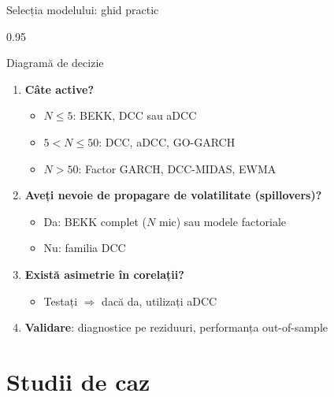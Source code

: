 \documentclass[9pt, aspectratio=169, t]{beamer}
\begin{document}
\begin{frame}{Selecția modelului: ghid practic}
    \begin{cminipage}{0.95\textwidth}
    {\footnotesize
    \begin{block}{Diagramă de decizie}
        \begin{enumerate}\setlength{\itemsep}{2pt}
            \item \textbf{Câte active?}
                \begin{itemize}\setlength{\itemsep}{0pt}
                    \item $N \leq 5$: BEKK, DCC sau aDCC
                    \item $5 < N \leq 50$: DCC, aDCC, GO-GARCH
                    \item $N > 50$: Factor GARCH, DCC-MIDAS, EWMA
                \end{itemize}
            \item \textbf{Aveți nevoie de propagare de volatilitate (spillovers)?}
                \begin{itemize}\setlength{\itemsep}{0pt}
                    \item Da: BEKK complet ($N$ mic) sau modele factoriale
                    \item Nu: familia DCC
                \end{itemize}
            \item \textbf{Există asimetrie în corelații?}
                \begin{itemize}\setlength{\itemsep}{0pt}
                    \item Testați $\Rightarrow$ dacă da, utilizați aDCC
                \end{itemize}
            \item \textbf{Validare}: diagnostice pe reziduuri, performanța out-of-sample
        \end{enumerate}
    \end{block}
    }
    \end{cminipage}
\end{frame}

\section{Studii de caz}
\end{document}
